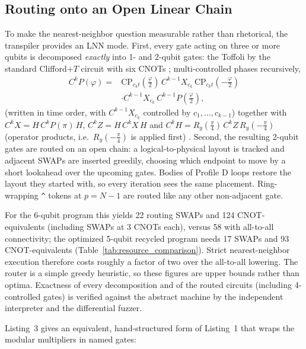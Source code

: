 \documentclass[11pt,a4paper,twocolumn]{article}
\begin{document}
\subsection{Routing onto an Open Linear Chain}
\label{sec:lnn}
To make the nearest-neighbor question measurable rather than rhetorical, the transpiler provides an LNN mode. First, every gate acting on three or more qubits is decomposed \emph{exactly} into 1- and 2-qubit gates: the Toffoli by the standard Clifford+$T$ circuit with six CNOTs \cite{nielsen2010quantum}; multi-controlled phases recursively,
\begin{equation}
\begin{aligned}
    C^{k}P(\varphi) ={} &\mathrm{CP}_{c_k t}(\tfrac{\varphi}{2})\, C^{k-1}X_{c_k}\, \mathrm{CP}_{c_k t}(-\tfrac{\varphi}{2}) \\
    &\cdot C^{k-1}X_{c_k}\, C^{k-1}P(\tfrac{\varphi}{2}),
\end{aligned}
\end{equation}
(written in time order, with $C^{k-1}X_{c_k}$ controlled by $c_1, \dots, c_{k-1}$) together with $C^kX = H\,C^kP(\pi)\,H$, $C^kZ = H\,C^kX\,H$ and $C^kH = R_y(\tfrac{\pi}{4})\,C^kZ\,R_y(-\tfrac{\pi}{4})$ (operator products, i.e.\ $R_y(-\tfrac{\pi}{4})$ is applied first) \cite{barenco1995elementary}. Second, the resulting 2-qubit gates are routed on an open chain: a logical-to-physical layout is tracked and adjacent SWAPs are inserted greedily, choosing which endpoint to move by a short lookahead over the upcoming gates. Bodies of Profile D loops restore the layout they started with, so every iteration sees the same placement. Ring-wrapping \texttt{\^{}} tokens at $p = N-1$ are routed like any other non-adjacent gate.

For the 6-qubit program this yields 22 routing SWAPs and 124 CNOT-equivalents (including SWAPs at 3 CNOTs each), versus 58 with all-to-all connectivity; the optimized 5-qubit recycled program needs 17 SWAPs and 93 CNOT-equivalents (Table~\ref{tab:resource_comparison}). Strict nearest-neighbor execution therefore costs roughly a factor of two over the all-to-all lowering. The router is a simple greedy heuristic, so these figures are upper bounds rather than optima. Exactness of every decomposition and of the routed circuits (including 4-controlled gates) is verified against the abstract machine by the independent interpreter and the differential fuzzer.

Listing~3 gives an equivalent, hand-structured form of Listing~1 that wraps the modular multipliers in named gates:
\end{document}
